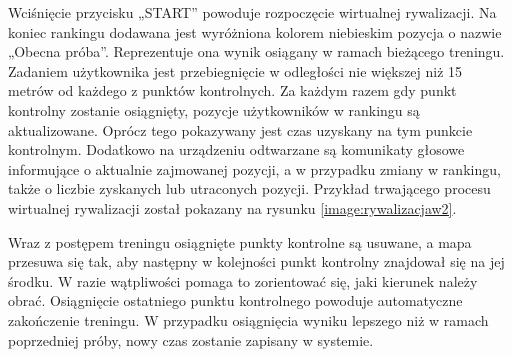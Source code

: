 Wciśnięcie przycisku „START” powoduje rozpoczęcie wirtualnej rywalizacji. Na koniec rankingu dodawana jest wyróżniona kolorem niebieskim pozycja o nazwie „Obecna próba”. Reprezentuje ona wynik osiągany w ramach bieżącego treningu. Zadaniem użytkownika jest przebiegnięcie w odległości nie większej niż 15 metrów od każdego z punktów kontrolnych. Za każdym razem gdy punkt kontrolny zostanie osiągnięty, pozycje użytkowników w rankingu są aktualizowane. Oprócz tego pokazywany jest czas uzyskany na tym punkcie kontrolnym.  Dodatkowo na urządzeniu odtwarzane są komunikaty głosowe informujące o aktualnie zajmowanej pozycji, a w przypadku zmiany w rankingu, także o liczbie zyskanych lub utraconych pozycji. Przykład trwającego procesu wirtualnej rywalizacji został pokazany na rysunku \ref{image:rywalizacjaw2}.

Wraz z postępem treningu osiągnięte punkty kontrolne są usuwane, a mapa przesuwa się tak, aby następny w kolejności punkt kontrolny znajdował się na jej środku. W razie wątpliwości pomaga to zorientować się, jaki kierunek należy obrać. Osiągnięcie ostatniego punktu kontrolnego powoduje automatyczne zakończenie treningu. W przypadku osiągnięcia wyniku lepszego niż w ramach poprzedniej próby, nowy czas zostanie zapisany w systemie.
